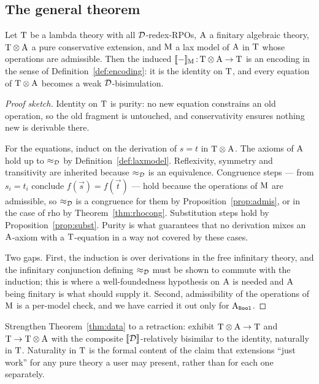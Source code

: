 \documentclass{article}
\begin{document}
\subsection{The general theorem}

\begin{theorem}
\label{thm:data}
    \stSketch{} Let $\mathrm{T}$ be a lambda theory with all $\mathcal{D}$-redex-RPOs, $\mathrm{A}$ a finitary algebraic theory, $\mathrm{T}\otimes\mathrm{A}$ a pure conservative extension, and $\mathrm{M}$ a lax model of $\mathrm{A}$ in $\mathrm{T}$ whose operations are admissible. Then the induced $[\![-]\!]_{\mathrm{M}}\,{:}\,\mathrm{T}\otimes\mathrm{A}\to\mathrm{T}$ is an encoding in the sense of Definition~\ref{def:encoding}: it is the identity on $\mathrm{T}$, and every equation of $\mathrm{T}\otimes\mathrm{A}$ becomes a weak $\mathcal{D}$-bisimulation.
\end{theorem}
\begin{proof}[Proof sketch]
    Identity on $\mathrm{T}$ is purity: no new equation constrains an old operation, so the old fragment is untouched, and conservativity ensures nothing new is derivable there.

    For the equations, induct on the derivation of $s=t$ in $\mathrm{T}\otimes\mathrm{A}$. The axioms of $\mathrm{A}$ hold up to $\approx_{\mathcal{D}}$ by Definition~\ref{def:laxmodel}. Reflexivity, symmetry and transitivity are inherited because $\approx_{\mathcal{D}}$ is an equivalence. Congruence steps --- from $s_i=t_i$ conclude $f(\vec{s})=f(\vec{t})$ --- hold because the operations of $\mathrm{M}$ are admissible, so $\approx_{\mathcal{D}}$ is a congruence for them by Proposition~\ref{prop:admis}, or in the case of rho by Theorem~\ref{thm:rhocong}. Substitution steps hold by Proposition~\ref{prop:subst}. Purity is what guarantees that no derivation mixes an $\mathrm{A}$-axiom with a $\mathrm{T}$-equation in a way not covered by these cases.

    Two gaps. First, the induction is over derivations in the free infinitary theory, and the infinitary conjunction defining $\approx_{\mathcal{D}}$ must be shown to commute with the induction; this is where a well-foundedness hypothesis on $\mathrm{A}$ is needed and $\mathrm{A}$ being finitary is what should supply it. Second, admissibility of the operations of $\mathrm{M}$ is a per-model check, and we have carried it out only for $\mathrm{A}_{\mathtt{Bool}}$.
\end{proof}

\begin{obligation}
\label{ob:retract}
    Strengthen Theorem~\ref{thm:data} to a retraction: exhibit $\mathrm{T}\otimes\mathrm{A}\to\mathrm{T}$ and $\mathrm{T}\to\mathrm{T}\otimes\mathrm{A}$ with the composite $[\![\mathcal{D}]\!]$-relatively bisimilar to the identity, naturally in $\mathrm{T}$. Naturality in $\mathrm{T}$ is the formal content of the claim that extensions ``just work'' for any pure theory a user may present, rather than for each one separately.
\end{obligation}
\end{document}
